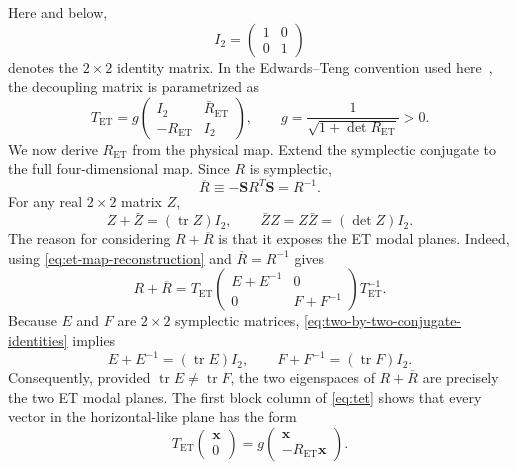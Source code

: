 \documentclass[11pt,a4paper]{article}
\newcommand{\Tr}{\operatorname{tr}}
\newcommand{\mat}[1]{\bm{#1}}
\begin{document}
Here and below,
\begin{equation}
 I_2=\begin{pmatrix}1&0\\0&1\end{pmatrix}
\end{equation}
denotes the $2\times2$ identity matrix.  In the Edwards--Teng convention used
here~\cite{EdwardsTeng}, the decoupling matrix is parametrized as
\begin{equation}
 T_{\mathrm{ET}}
 =g
 \begin{pmatrix}
  I_2&\bar R_{\mathrm{ET}}\\
  -R_{\mathrm{ET}}&I_2
 \end{pmatrix},
 \qquad
 g=\frac{1}{\sqrt{1+\det R_{\mathrm{ET}}}}>0.
 \label{eq:tet}
\end{equation}
We now derive $R_{\mathrm{ET}}$ from the physical map.  Extend the symplectic
conjugate to the full four-dimensional map.  Since $R$ is symplectic,
\begin{equation}
 \overline R\equiv-\mat S R^T\mat S=R^{-1}.
\end{equation}
For any real $2\times2$ matrix $Z$,
\begin{equation}
 Z+\bar Z=(\Tr Z)I_2,
 \qquad
 \bar Z Z=Z\bar Z=(\det Z)I_2.
 \label{eq:two-by-two-conjugate-identities}
\end{equation}
The reason for considering $R+\overline R$ is that it exposes the ET modal
planes.  Indeed, using \cref{eq:et-map-reconstruction} and
$\overline R=R^{-1}$ gives
\begin{equation}
 R+\overline R
 =T_{\mathrm{ET}}
  \begin{pmatrix}
   E+E^{-1}&0\\0&F+F^{-1}
  \end{pmatrix}
  T_{\mathrm{ET}}^{-1}.
 \label{eq:R-plus-Rbar-et-basis}
\end{equation}
Because $E$ and $F$ are $2\times2$ symplectic matrices,
\cref{eq:two-by-two-conjugate-identities} implies
\begin{equation}
 E+E^{-1}=(\Tr E)I_2,
 \qquad
 F+F^{-1}=(\Tr F)I_2.
 \label{eq:modal-map-plus-inverse}
\end{equation}
Consequently, provided $\Tr E\ne\Tr F$, the two eigenspaces of
$R+\overline R$ are precisely the two ET modal planes.  The first block
column of \cref{eq:tet} shows that every vector in the horizontal-like plane
has the form
\begin{equation}
 T_{\mathrm{ET}}
 \begin{pmatrix}\mat x\\0\end{pmatrix}
 =g\begin{pmatrix}\mat x\\-R_{\mathrm{ET}}\mat x\end{pmatrix}.
 \label{eq:first-et-plane-from-tet}
\end{equation}
\end{document}
